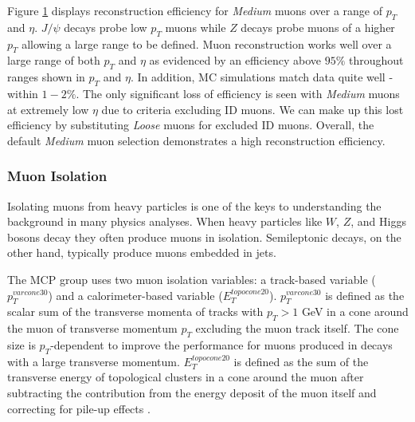 \begin{figure}[!h]
  \label{fig:efficiency}
\end{figure}

Figure \ref{fig:efficiency} displays reconstruction efficiency for \textit{Medium} muons over a range of $p_T$ and $\eta$. $J/\psi$ decays probe low $p_T$ muons while $Z$ decays probe muons of a higher $p_T$ allowing a large range to be defined.  Muon reconstruction works well over a large range of both $p_T$ and $\eta$ as evidenced by an efficiency above $95\%$ throughout ranges shown in $p_T$ and $\eta$. In addition, MC simulations match data quite well - within $1-2\%$. The only significant loss of efficiency is seen with \textit{Medium} muons at extremely low $\eta$ due to criteria excluding ID muons. We can make up this lost efficiency by substituting \textit{Loose} muons for excluded ID muons. Overall, the default \textit{Medium} muon selection demonstrates a high reconstruction efficiency. 

\subsubsection{Muon Isolation} 
\par \hspace{20pt} Isolating muons from heavy particles is one of the keys to understanding the background in many physics analyses. When heavy particles like $W$, $Z$, and Higgs bosons decay they often produce muons in isolation. Semileptonic decays, on the other hand, typically produce muons embedded in jets.

\par \hspace{20pt} The MCP group uses two muon isolation variables: a track-based variable ($p_T^{varcone30}$) and a calorimeter-based variable ($E_T^{topocone20}$). $p_T^{varcone30}$ is defined as the scalar sum of the transverse momenta of tracks with $p_T > 1$ GeV in a cone around the muon of transverse momentum $p_T$ excluding the muon track itself. The cone size is $p_T$-dependent to improve the performance for muons produced in decays with a large transverse momentum. $E_T^{topocone20}$ is defined as the sum of the transverse energy of topological clusters in a cone around the muon after subtracting the contribution from the energy deposit of the muon itself and correcting for pile-up effects \cite{jets}. 


